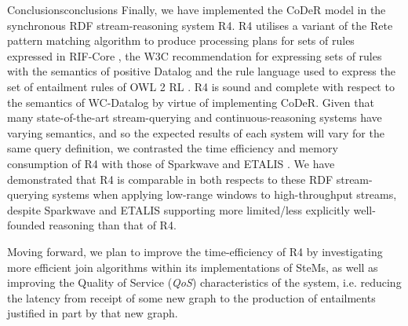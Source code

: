 \begin{nestedsection}{Conclusions}{conclusions}
	Finally, we have implemented the CoDeR model in the synchronous RDF stream-reasoning system R4.
	R4 utilises a variant of the Rete pattern matching algorithm \citep{forgy79} to produce processing plans for sets of rules expressed in RIF-Core \citep{w3crifcore}, the W3C recommendation for expressing sets of rules with the semantics of positive Datalog and the rule language used to express the set of entailment rules of OWL 2 RL \citep{w3cowl2profiles}.
	R4 is sound and complete with respect to the semantics of WC-Datalog by virtue of implementing CoDeR.
	Given that many state-of-the-art stream-querying and continuous-reasoning systems have varying semantics, and so the expected results of each system will vary for the same query definition, we contrasted the time efficiency and memory consumption of R4 with those of Sparkwave \citep{sparkwave} and ETALIS \citep{EP-SPARQL}.
	We have demonstrated that R4 is comparable in both respects to these RDF stream-querying systems when applying low-range windows to high-throughput streams, despite Sparkwave and ETALIS supporting more limited/less explicitly well-founded reasoning than that of R4.

	Moving forward, we plan to improve the time-efficiency of R4 by investigating more efficient join algorithms within its implementations of SteMs, as well as improving the Quality of Service (\emph{QoS}) characteristics of the system, i.e. reducing the latency from receipt of some new graph to the production of entailments justified in part by that new graph.
\end{nestedsection}